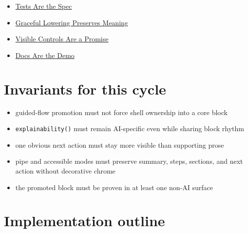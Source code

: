 \begin{itemize}
\tightlist
\item
  \href{https://github.com/flyingrobots/bijou/blob/cbd70612140e7a450d764b3c7be1c6af878b99bc/docs/invariants/tests-are-the-spec.md}{Tests Are the Spec}
\item
  \href{https://github.com/flyingrobots/bijou/blob/cbd70612140e7a450d764b3c7be1c6af878b99bc/docs/invariants/graceful-lowering-preserves-meaning.md}{Graceful Lowering Preserves Meaning}
\item
  \href{https://github.com/flyingrobots/bijou/blob/cbd70612140e7a450d764b3c7be1c6af878b99bc/docs/invariants/visible-controls-are-a-promise.md}{Visible Controls Are a Promise}
\item
  \href{https://github.com/flyingrobots/bijou/blob/cbd70612140e7a450d764b3c7be1c6af878b99bc/docs/invariants/docs-are-the-demo.md}{Docs Are the Demo}
\end{itemize}

\section{Invariants for this cycle}\label{record-175-invariants-for-this-cycle}

\begin{itemize}
\tightlist
\item
  guided-flow promotion must not force shell ownership into a core block
\item
  \texttt{e\allowbreak{}x\allowbreak{}p\allowbreak{}l\allowbreak{}a\allowbreak{}i\allowbreak{}n\allowbreak{}a\allowbreak{}b\allowbreak{}i\allowbreak{}l\allowbreak{}i\allowbreak{}t\allowbreak{}y\allowbreak{}(\allowbreak{})} must remain AI-specific even while sharing block rhythm
\item
  one obvious next action must stay more visible than supporting prose
\item
  pipe and accessible modes must preserve summary, steps, sections, and next action without decorative chrome
\item
  the promoted block must be proven in at least one non-AI surface
\end{itemize}

\section{Implementation outline}\label{record-175-implementation-outline}

